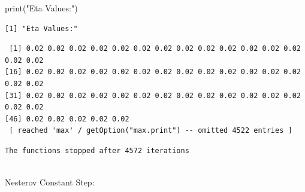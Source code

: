 \documentclass[
  letterpaper,
  DIV=11,
  numbers=noendperiod]{scrartcl}
\newenvironment{Shaded}{\begin{snugshade}}{\end{snugshade}}
\newcommand{\FunctionTok}[1]{\textcolor[rgb]{0.28,0.35,0.67}{#1}}
\newcommand{\NormalTok}[1]{\textcolor[rgb]{0.00,0.23,0.31}{#1}}
\newcommand{\SpecialCharTok}[1]{\textcolor[rgb]{0.37,0.37,0.37}{#1}}
\newcommand{\StringTok}[1]{\textcolor[rgb]{0.13,0.47,0.30}{#1}}
\begin{document}
\begin{Shaded}
\begin{Highlighting}[]
\FunctionTok{print}\NormalTok{(}\StringTok{"Eta Values:"}\NormalTok{)}
\end{Highlighting}
\end{Shaded}

\begin{verbatim}
[1] "Eta Values:"
\end{verbatim}

\begin{Shaded}
\end{Shaded}

\begin{verbatim}
 [1] 0.02 0.02 0.02 0.02 0.02 0.02 0.02 0.02 0.02 0.02 0.02 0.02 0.02 0.02 0.02
[16] 0.02 0.02 0.02 0.02 0.02 0.02 0.02 0.02 0.02 0.02 0.02 0.02 0.02 0.02 0.02
[31] 0.02 0.02 0.02 0.02 0.02 0.02 0.02 0.02 0.02 0.02 0.02 0.02 0.02 0.02 0.02
[46] 0.02 0.02 0.02 0.02 0.02
 [ reached 'max' / getOption("max.print") -- omitted 4522 entries ]
\end{verbatim}

\begin{Shaded}
\end{Shaded}

\begin{verbatim}
The functions stopped after 4572 iterations 
 
\end{verbatim}

Nesterov Constant Step:
\end{document}
